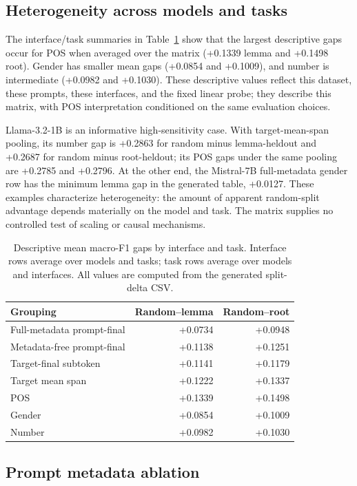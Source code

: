 \documentclass[pdflatex,sn-basic]{sn-jnl}
\begin{document}
\subsection{Heterogeneity across models and tasks}

The interface/task summaries in Table~\ref{tab:axis-deltas} show that the
largest descriptive gaps occur for POS when averaged over the matrix (+0.1339
lemma and +0.1498 root). Gender has smaller mean gaps (+0.0854 and +0.1009),
and number is intermediate (+0.0982 and +0.1030). These descriptive values
reflect this dataset, these prompts, these interfaces, and the fixed linear
probe; they describe this matrix, with POS interpretation conditioned on the
same evaluation choices.

Llama-3.2-1B is an informative high-sensitivity case. With target-mean-span
pooling, its number gap is +0.2863 for random minus lemma-heldout and +0.2687
for random minus root-heldout; its POS gaps under the same pooling are +0.2785
and +0.2796. At the other end, the Mistral-7B full-metadata gender row has the
minimum lemma gap in the generated table, +0.0127. These examples characterize
heterogeneity: the amount of apparent random-split advantage depends
materially on the model and task. The matrix supplies no controlled test of
scaling or causal mechanisms.

\begin{table}[t]
\centering
\caption{Descriptive mean macro-F1 gaps by interface and task. Interface rows
average over models and tasks; task rows average over models and interfaces.
All values are computed from the generated split-delta CSV.}
\label{tab:axis-deltas}
\small
\begin{tabular}{lrr}
\toprule
Grouping & Random--lemma & Random--root \\
\midrule
Full-metadata prompt-final & +0.0734 & +0.0948 \\
Metadata-free prompt-final & +0.1138 & +0.1251 \\
Target-final subtoken & +0.1141 & +0.1179 \\
Target mean span & +0.1222 & +0.1337 \\
\midrule
POS & +0.1339 & +0.1498 \\
Gender & +0.0854 & +0.1009 \\
Number & +0.0982 & +0.1030 \\
\bottomrule
\end{tabular}
\end{table}

\subsection{Prompt metadata ablation}
\end{document}
